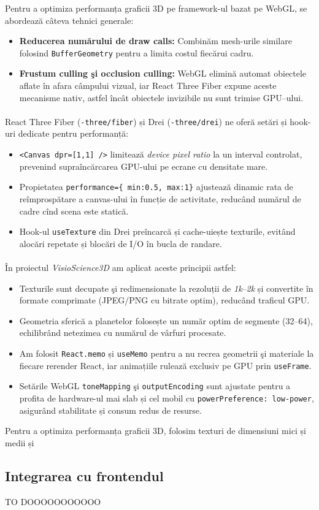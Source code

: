 Pentru a optimiza performanța graficii 3D pe framework-ul bazat pe WebGL, se abordează câteva tehnici generale:
\begin{itemize}
  \item \textbf{Reducerea numărului de draw calls:}
    Combinăm mesh-urile similare folosind \texttt{BufferGeometry} 
    pentru a limita costul fiecărui cadru.
  \item \textbf{Frustum culling şi occlusion culling:} 
    WebGL elimină automat obiectele aflate în afara câmpului vizual, 
    iar React Three Fiber expune aceste mecanisme nativ, astfel încât
    obiectele invizibile nu sunt trimise GPU–ului.
\end{itemize}

\paragraph{}  
React Three Fiber (\texttt{\@react-three/fiber}) și Drei (\texttt{\@react-three/drei}) ne oferă setări și hook-uri dedicate pentru performanță:
\begin{itemize}
  \item \texttt{<Canvas dpr={[1,1]} />} limitează \emph{device pixel ratio} la un 
  interval controlat, prevenind supraîncărcarea GPU-ului pe ecrane cu densitate mare.
  \item Propietatea \texttt{performance=\{\,min:0.5, max:1\}} ajustează dinamic rata 
  de reîmprospătare a canvas-ului în funcție de activitate, reducând numărul de 
  cadre cînd scena este statică.
  \item Hook-ul \texttt{useTexture} din Drei preîncarcă și cache-uiește texturile,
    evitând alocări repetate și blocări de I/O în bucla de randare.
\end{itemize}

\paragraph{}  
În proiectul \textit{VisioScience3D} am aplicat aceste principii astfel:
\begin{itemize}
  \item Texturile sunt decupate şi redimensionate la rezoluții de \emph{1k}–\emph{2k}
   și convertite în formate comprimate (JPEG/PNG cu bitrate optim), reducând traficul GPU.
  \item Geometria sferică a planetelor folosește un număr optim de segmente (32–64), 
    echilibrând netezimea cu numărul de vârfuri procesate.
  \item Am folosit \texttt{React.memo} și \texttt{useMemo} pentru a nu recrea geometrii
    şi materiale la fiecare rerender React, iar animațiile rulează exclusiv pe GPU prin \texttt{useFrame}.
  \item Setările WebGL \texttt{toneMapping} şi \texttt{outputEncoding} sunt ajustate pentru 
    a profita de hardware-ul mai slab și cel mobil cu \texttt{powerPreference: low-power}, asigurând
    stabilitate și consum redus de resurse.
\end{itemize}

Pentru a optimiza performanța graficii 3D, folosim texturi de dimensiuni mici și medii și
\subsection{Integrarea cu frontendul}

TO DOOOOOOOOOOO







